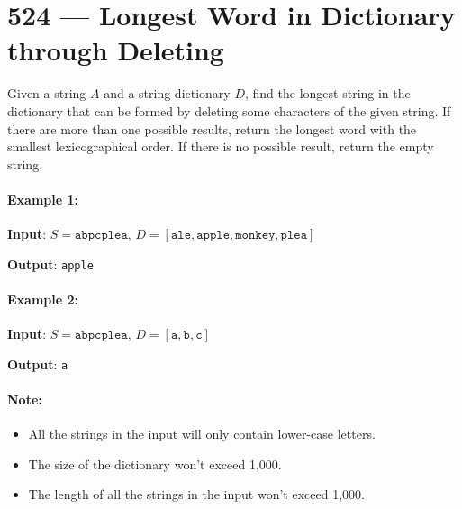 \section{524 --- Longest Word in Dictionary through Deleting}
Given a string $A$ and a string dictionary $D$, find the longest string in the dictionary that can be formed by deleting some characters of the given string. If there are more than one possible results, return the longest word with the smallest lexicographical order. If there is no possible result, return the empty string.

\paragraph{Example 1:}

\begin{flushleft}
\textbf{Input}: $S = \texttt{abpcplea}$, $D = [\texttt{ale},\texttt{apple},\texttt{monkey},\texttt{plea}]$

\textbf{Output}: \texttt{apple}
\end{flushleft}

\paragraph{Example 2:}

\begin{flushleft}
\textbf{Input}: $S = \texttt{abpcplea}$, $D = [\texttt{a},\texttt{b},\texttt{c}]$

\textbf{Output}: \texttt{a}
\end{flushleft}

\paragraph{Note:}

\begin{itemize}
\item All the strings in the input will only contain lower-case letters.
\item The size of the dictionary won't exceed 1,000.
\item The length of all the strings in the input won't exceed 1,000.
\end{itemize}
